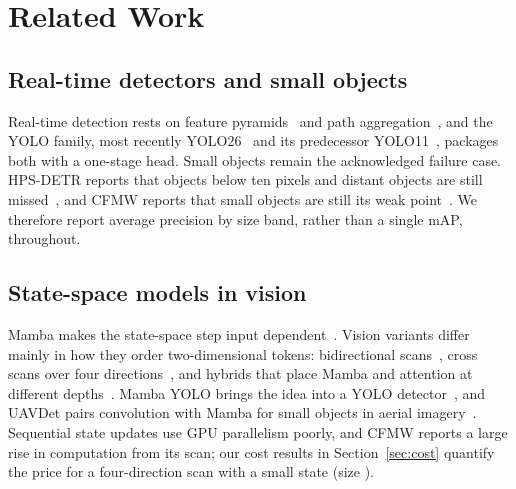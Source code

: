 \section{Related Work}
\label{sec:related}
\subsection{Real-time detectors and small objects}
Real-time detection rests on feature pyramids~\cite{lin2017fpn} and path aggregation~\cite{liu2018panet}, and the YOLO family, most recently YOLO26~\cite{yolo26_2026} and its predecessor YOLO11~\cite{yolo11_2024}, packages both with a one-stage head. Small objects remain the acknowledged failure case. HPS-DETR reports that objects below ten pixels and distant objects are still missed~\cite{wang2025hpsdetr}, and CFMW reports that small objects are still its weak point~\cite{li2025cfmw}. We therefore report average precision by size band, rather than a single mAP, throughout.

\subsection{State-space models in vision}
Mamba makes the state-space step input dependent~\cite{gu2023mamba}. Vision variants differ mainly in how they order two-dimensional tokens: bidirectional scans~\cite{zhu2024vim}, cross scans over four directions~\cite{liu2024vmamba}, and hybrids that place Mamba and attention at different depths~\cite{hatamizadeh2025mambavision}. Mamba YOLO brings the idea into a YOLO detector~\cite{wang2025mambayolo}, and UAVDet pairs convolution with Mamba for small objects in aerial imagery~\cite{yang2026uavdet}. Sequential state updates use GPU parallelism poorly, and CFMW reports a large rise in computation from its scan; our cost results in Section~\ref{sec:cost} quantify the price for a four-direction scan with a small state (size \cfgDState{}).

